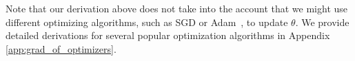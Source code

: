 

Note that our derivation above does not take into the account that we might use different optimizing algorithms, such as SGD or Adam~\citep{adam}, to update $\theta$. We provide detailed derivations for several popular optimization algorithms in Appendix \ref{app:grad_of_optimizers}.     

